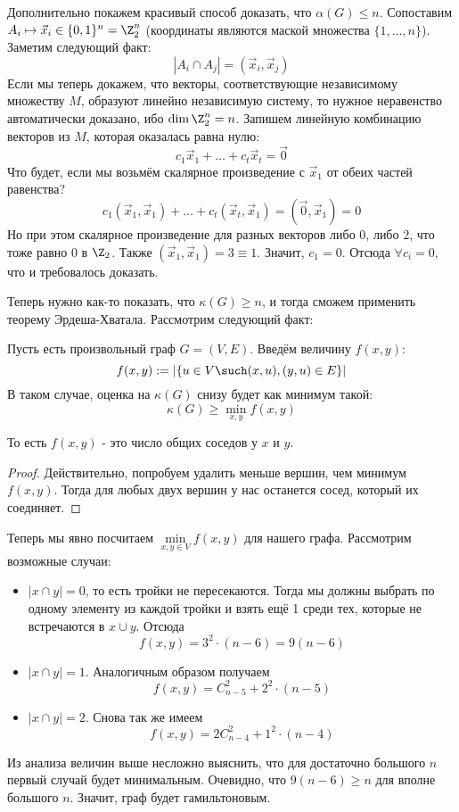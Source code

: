 \begin{example}
	Дополнительно покажем красивый способ доказать, что $\alpha(G) \le n$. Сопоставим $A_i \mapsto \vec{x}_i \in \{0, 1\}^n = \Z_2^n$ (координаты являются маской множества $\{1, \ldots, n\}$). Заметим следующий факт:
	\[
		|A_i \cap A_j| = (\vec{x}_i, \vec{x}_j)
	\]
	Если мы теперь докажем, что векторы, соответствующие независимому множеству $M$, образуют линейно независимую систему, то нужное неравенство автоматически доказано, ибо $\dim \Z_2^n = n$. Запишем линейную комбинацию векторов из $M$, которая оказалась равна нулю:
	\[
		c_1 \vec{x}_1 + \ldots + c_t \vec{x}_t = \vec{0}
	\]
	Что будет, если мы возьмём скалярное произведение с $\vec{x}_1$ от обеих частей равенства?
	\[
		c_1 (\vec{x}_1, \vec{x}_1) + \ldots + c_t (\vec{x}_t, \vec{x}_1) = (\vec{0}, \vec{x}_1) = 0
	\]
	Но при этом скалярное произведение для разных векторов либо 0, либо 2, что тоже равно 0 в $\Z_2$. Также $(\vec{x}_1, \vec{x}_1) = 3 \equiv 1$. Значит, $c_1 = 0$. Отсюда $\forall c_i = 0$, что и требовалось доказать.
	
	Теперь нужно как-то показать, что $\kappa(G) \ge n$, и тогда сможем применить теорему Эрдеша-Хватала. Рассмотрим следующий факт:
	\begin{proposition}
		Пусть есть произвольный граф $G = (V, E)$. Введём величину $f(x, y)$:
		\[
			f(x, y) := |\{u \in V \such (x, u), (y, u) \in E\}|
		\]
		В таком случае, оценка на $\kappa(G)$ снизу будет как минимум такой:
		\[
			\kappa(G) \ge \min\limits_{x, y} f(x, y)
		\]
	\end{proposition}

	\begin{note}
		То есть $f(x, y)$ - это число общих соседов у $x$ и $y$.
	\end{note}

	\begin{proof}
		Действительно, попробуем удалить меньше вершин, чем минимум $f(x, y)$. Тогда для любых двух вершин у нас останется сосед, который их соединяет.
	\end{proof}

	Теперь мы явно посчитаем $\min\limits_{x, y \in V} f(x, y)$ для нашего графа. Рассмотрим возможные случаи:
	\begin{itemize}
		\item $|x \cap y| = 0$, то есть тройки не пересекаются. Тогда мы должны выбрать по одному элементу из каждой тройки и взять ещё 1 среди тех, которые не встречаются в $x \cup y$. Отсюда
		\[
			f(x, y) = 3^2 \cdot (n - 6) = 9(n - 6)
		\]
		
		\item $|x \cap y| = 1$. Аналогичным образом получаем
		\[
			f(x, y) = C_{n - 5}^2 + 2^2 \cdot (n - 5)
		\]
		
		\item $|x \cap y| = 2$. Снова так же имеем
		\[
			f(x, y) = 2C_{n - 4}^2 + 1^2 \cdot (n - 4)
		\]
	\end{itemize}
	Из анализа величин выше несложно выяснить, что для достаточно большого $n$ первый случай будет минимальным. Очевидно, что $9(n - 6) \ge n$ для вполне большого $n$. Значит, граф будет гамильтоновым.
\end{example}